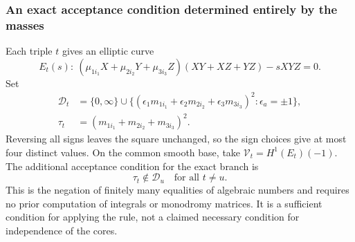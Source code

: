 \documentclass[11pt,a4paper,oneside]{article}
\theoremstyle{plain}
\theoremstyle{definition}
\theoremstyle{remark}
\numberwithin{equation}{section}
\begin{document}
\subsubsection{An exact acceptance condition determined entirely by the masses}
Each triple $t$ gives an elliptic curve
\[
 E_t(s):\
 (\mu_{1i_1}X+\mu_{2i_2}Y+\mu_{3i_3}Z)(XY+XZ+YZ)-sXYZ=0.
\]
Set
\begin{align}
 \mathcal D_t&=\{0,\infty\}\cup
 \{(\epsilon_1m_{1i_1}+\epsilon_2m_{2i_2}
                       +\epsilon_3m_{3i_3})^2:\epsilon_a=\pm1\},\label{unified:eq:thetadiscr}\\
 \tau_t&=(m_{1i_1}+m_{2i_2}+m_{3i_3})^2 .\nonumber
\end{align}
Reversing all signs leaves the square unchanged, so the sign choices give at most four distinct values.
On the common smooth base, take $\mathcal V_t=H^1(E_t)(-1)$.
The additional acceptance condition for the exact branch is
\begin{equation}\label{unified:eq:thetaprivate}
             \tau_t\notin\mathcal D_u\quad\text{for all }t\ne u .
\end{equation}
This is the negation of finitely many equalities of algebraic numbers and requires no prior computation of integrals or monodromy matrices.
It is a sufficient condition for applying the rule, not a claimed necessary condition for independence of the cores.
\end{document}
